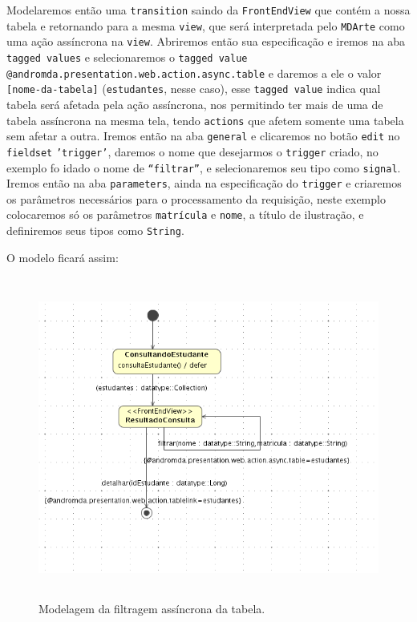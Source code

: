 Modelaremos então uma \texttt{transition} saindo da \texttt{FrontEndView} que
contém a nossa tabela e retornando para a mesma \texttt{view}, que será
interpretada pelo \texttt{MDArte} como uma ação assíncrona na \texttt{view}.
Abriremos então sua especificação e iremos na aba \texttt{tagged values} e
selecionaremos o \texttt{tagged value}
\texttt{@andromda.presentation.web.action.async.table} e daremos a ele o valor
\texttt{[nome-da-tabela]} (\texttt{estudantes}, nesse caso), esse \texttt{tagged
value} indica qual tabela será afetada pela ação assíncrona, nos permitindo ter
mais de uma de tabela assíncrona na mesma tela, tendo \texttt{actions} que
afetem somente uma tabela sem afetar a outra. Iremos então na aba
\texttt{general} e clicaremos no botão \texttt{edit} no \texttt{fieldset}
\texttt{'trigger'}, daremos o nome que desejarmos o \texttt{trigger} criado, no
exemplo fo idado o nome de \texttt{“filtrar”}, e selecionaremos seu tipo como
\texttt{signal}. Iremos então na aba \texttt{parameters}, ainda na especificação
do \texttt{trigger} e criaremos os parâmetros necessários para o processamento
da requisição, neste exemplo colocaremos só os parâmetros \texttt{matrícula} e
\texttt{nome}, a título de ilustração, e definiremos seus tipos como
\texttt{String}.

O modelo ficará assim:
\begin{figure}[H]
	\centering
	\includegraphics[width=340pt,height=300pt]{files/imgs/tutorial-mdarte-0036.png}
	\caption{Modelagem da filtragem assíncrona da tabela.}
	\label{modelando_filtragem_assincrona}
\end{figure}

